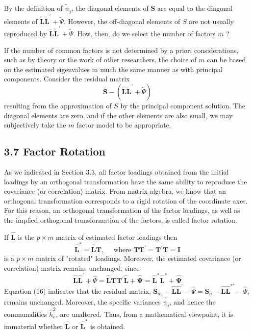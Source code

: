 \documentclass[12pt]{article}
\begin{document}
\noindent By the definition of $\widetilde{\psi}_i$, the diagonal elements of $\mathbf{S}$ are equal to the diagonal elements of $\widetilde{\mathbf{L}} \widetilde{\mathbf{L}}^{\prime}+\widetilde{\Psi}$. However, the off-diagonal elements of $S$ are not usually reproduced by $\widetilde{\mathbf{L}} \widetilde{\mathbf{L}}^{\prime}+\widetilde{\Psi}$. How, then, do we select the number of factors $m$ ?

\noindent If the number of common factors is not determined by a priori considerations, such as by theory or the work of other researchers, the choice of $m$ can be based on the estimated eigenvalues in much the same manner as with principal components. Consider the residual matrix
$$
\mathbf{S}-\left(\widetilde{\mathbf{L}} \tilde{\mathbf{L}}^{\prime}+\widetilde{\Psi}\right)
$$
resulting from the approximation of $S$ by the principal component solution. The diagonal elements are zero, and if the other elements are also small, we may subjectively take the $m$ factor model to be appropriate.

\subsection*{3.7 Factor Rotation}

As we indicated in Section 3.3, all factor loadings obtained from the initial loadings by an orthogonal transformation have the same ability to reproduce the covariance (or correlation) matrix. From matrix algebra, we know that an orthogonal transformation corresponds to a rigid rotation of the coordinate axes. For this reason, an orthogonal transformation of the factor loadings, as well as the implied orthogonal transformation of the factors, is called factor rotation.

\noindent If $\hat{\mathbf{L}}$ is the $p \times m$ matrix of estimated factor loadings then
\begin{equation}
	\hat{\mathbf{L}}^*=\hat{\mathbf{L}} \mathbf{T}, \quad \text { where } \mathbf{T T}^{\prime}=\mathbf{T}^{\prime} \mathbf{T}=\mathbf{I}
\end{equation}
is a $p \times m$ matrix of "rotated" loadings. Moreover, the estimated covariance (or correlation) matrix remains unchanged, since
\begin{equation}
	\hat{\mathbf{L}} \hat{\mathbf{L}}^{\prime}+\hat{\Psi}=\hat{\mathbf{L}} \mathbf{T T}^{\prime} \hat{\mathbf{L}}+\hat{\boldsymbol{\Psi}}=\hat{\mathbf{L}}^* \hat{\mathbf{L}}^*+\hat{\boldsymbol{\Psi}}
\end{equation}
Equation (16) indicates that the residual matrix, $\mathbf{S}_{n_{\hat{n}}}-\hat{\mathbf{L}} \hat{\mathbf{L}}^{\prime}-\hat{\Psi}=\mathbf{S}_n-\hat{\mathbf{L}} \hat{\mathbf{L}}^{* \prime}-\hat{\Psi}$, remains unchanged. Moreover, the specific variances $\hat{\psi}_i$, and hence the communalities $\hat{h}_i^2$, are unaltered. Thus, from a mathematical viewpoint, it is immaterial whether $\hat{\mathbf{L}}$ or $\hat{\mathbf{L}}^*$ is obtained.
\end{document}
